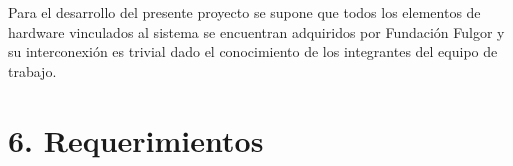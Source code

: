 \documentclass[
11pt, %
codirector, %
]{charter}
\begin{document}

Para el desarrollo del presente proyecto se supone que todos los elementos de hardware vinculados al sistema se encuentran adquiridos por Fundación Fulgor y su interconexión es trivial dado el conocimiento de los integrantes del equipo de trabajo.

\section{6. Requerimientos}
\label{sec:requerimientos}




\end{document}

